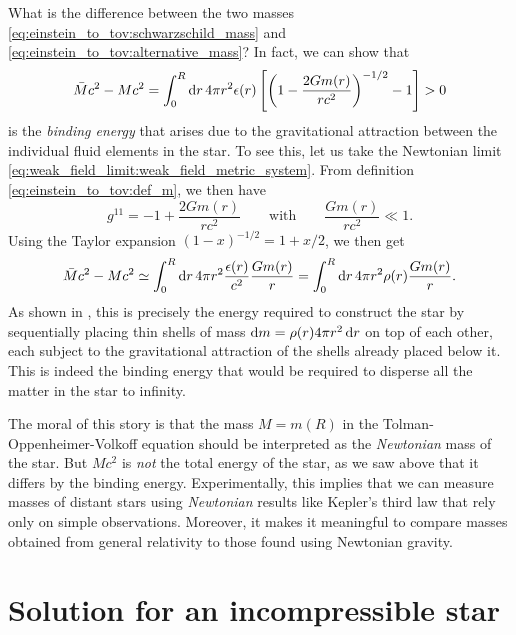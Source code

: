 What is the difference between the two masses \eqref{eq:einstein_to_tov:schwarzschild_mass} and \eqref{eq:einstein_to_tov:alternative_mass}?
In fact, we can show that
\begin{equation}
	\bar{M} c^2 - M c^2 = \integral{4 \pi r^2 \epsilon(r) \left[ \left( 1-\frac{2Gm(r)}{rc^2} \right)^{-1/2} - 1 \right]}{r}{0}{R} > 0
\end{equation}
is the \emph{binding energy} that arises due to the gravitational attraction between the individual fluid elements in the star.
To see this, let us take the Newtonian limit \eqref{eq:weak_field_limit:weak_field_metric_system}.
From definition \eqref{eq:einstein_to_tov:def_m}, we then have
\begin{equation}
	g^{11} = -1 + \frac{2 G m(r)}{r c^2}
	\qquad \text{with} \qquad
	\frac{G m(r)}{rc^2} \ll 1 .
	\label{eq:weak_field_limit:small_gmr}
\end{equation}
Using the Taylor expansion $(1 - x)^{-1/2} = 1 + x/2$, we then get
\begin{equation}
	\bar{M} c^2 - M c^2 \taylor \integral{4 \pi r^2 \frac{\epsilon(r)}{c^2} \frac{G m(r)}{r}}{r}{0}{R}
	                    =       \integral{4 \pi r^2 \rho(r) \frac{G m(r)}{r}}{r}{0}{R} .
\end{equation}
As shown in \cite[exercise 23.7]{ref:mtw}, this is precisely the energy required to construct the star by sequentially placing thin shells of mass $\dif m = \rho(r) 4 \pi r^2 \dif r$ on top of each other, each subject to the gravitational attraction of the shells already placed below it.
This is indeed the binding energy that would be required to disperse all the matter in the star to infinity.

The moral of this story is that the mass $M = m(R)$ in the Tolman-Oppenheimer-Volkoff equation should be interpreted as the \emph{Newtonian} mass of the star.
But $M c^2$ is \emph{not} the total energy of the star, as we saw above that it differs by the binding energy.
Experimentally, this implies that we can measure masses of distant stars using \emph{Newtonian} results like Kepler's third law that rely only on simple observations.
Moreover, it makes it meaningful to compare masses obtained from general relativity to those found using Newtonian gravity.
\section{Solution for an incompressible star}
\label{sec:incompressible_star}


